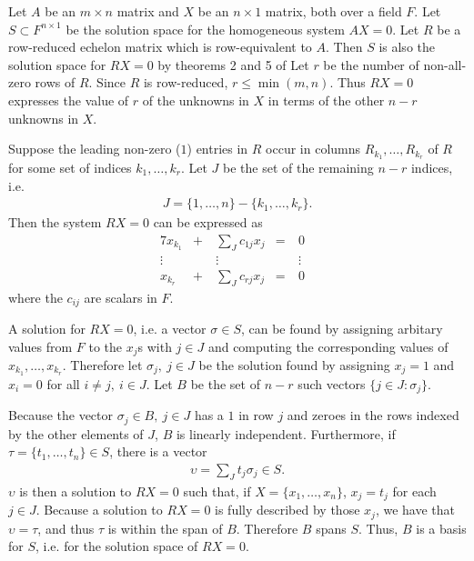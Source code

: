 \documentclass[12pt]{article}
\begin{document}
\begin{exm}
  Let $A$ be an $m \times n$ matrix and $X$ be an $n \times 1$ matrix, both over a
  field $F$. Let $S \subset F^{n \times 1}$ be the solution space for the homogeneous
  system $AX = 0$. Let $R$ be a row-reduced echelon matrix which is row-equivalent to
  $A$. Then $S$ is also the solution space for $RX = 0$ by theorems 2 and 5 of
   Let $r$ be the number of non-all-zero rows of $R$. Since $R$ is
  row-reduced, $r \leq \min(m,n)$. Thus $RX = 0$ expresses the value of $r$ of the
  unknowns in $X$ in terms of the other $n - r$ unknowns in $X$.

  Suppose the leading non-zero ($1$) entries in $R$ occur in columns
  $R_{k_1},\ldots,R_{k_r}$ of $R$ for some set of indices $k_1,\ldots,k_r$. Let $J$
  be the set of the remaining $n - r$ indices, i.e.
  \begin{align*}
    J = \{1,\ldots,n\} - \{k_1,\ldots,k_r\}.
  \end{align*}
  Then the system $RX = 0$ can be expressed as
  \begin{alignat*}{7}
    x_{k_1} &+&\ \sum_J c_{1j}x_j &=&\ 0&\\
    \vdots\  & &\ \vdots\ \ \ \ \ & &\ \vdots\ &\\
    x_{k_r} &+&\ \sum_J c_{rj}x_j &=&\ 0&
  \end{alignat*}
  where the $c_{ij}$ are scalars in $F$.

  A solution for $RX = 0$, i.e. a vector $\sigma \in S$, can be found by assigning
  arbitary values from $F$ to the $x_j$s with $j \in J$ and computing the
  corresponding values of $x_{k_1},\ldots,x_{k_r}$. Therefore let $\sigma_j,\ j \in
  J$ be the solution found by assigning $x_j = 1$ and $x_i = 0$ for all $i \neq j,\ i
  \in J$. Let $B$ be the set of $n - r$ such vectors $\{j \in J: \sigma_j\}$.

  Because the vector $\sigma_j \in B,\ j \in J$ has a $1$ in row $j$ and zeroes in
  the rows indexed by the other elements of $J$, $B$ is linearly independent.
  Furthermore, if $\tau = \{t_1,\ldots,t_n\} \in S$, there is a vector
  \begin{align*}
    \upsilon = \sum_J t_j\sigma_j \in S.
  \end{align*}
  $\upsilon$ is then a solution to $RX = 0$ such that, if $X = \{x_1,\ldots,x_n\}$,
  $x_j = t_j$ for each $j \in J$. Because a solution to $RX = 0$ is fully described
  by those $x_j$, we have that $\upsilon = \tau$, and thus $\tau$ is within the span
  of $B$. Therefore $B$ spans $S$. Thus, $B$ is a basis for $S$, i.e. for the
  solution space of $RX = 0$.
\end{exm}
\end{document}
